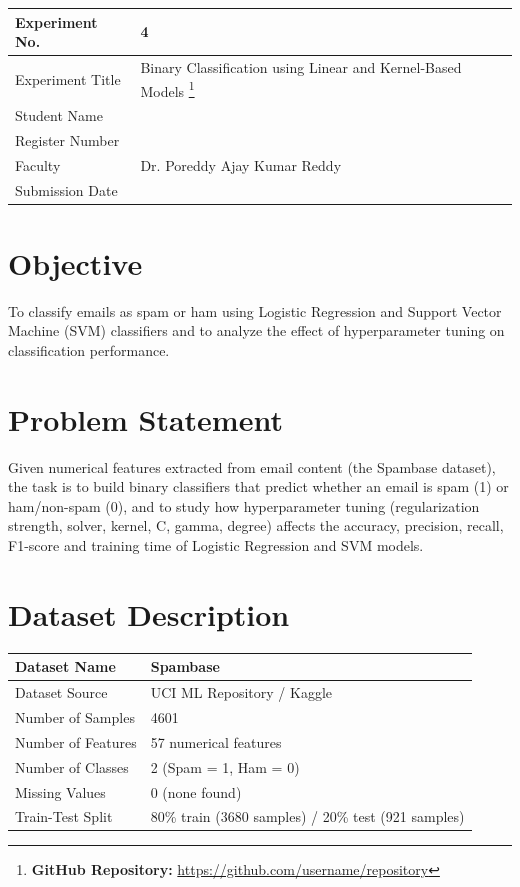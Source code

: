 \documentclass[12pt,a4paper]{article}
\begin{document}
\begin{tabular}{|p{4cm}|p{11cm}|}
\hline
Experiment No. & 4 \\ \hline
Experiment Title & Binary Classification using Linear and Kernel-Based Models
\footnote{\textbf{GitHub Repository: }\url{https://github.com/username/repository}}\\ \hline
Student Name & \\ \hline
Register Number & \\ \hline
Faculty & Dr. Poreddy Ajay Kumar Reddy \\ \hline
Submission Date & \\ \hline
\end{tabular}

\section{Objective}
To classify emails as spam or ham using Logistic Regression and Support Vector Machine (SVM)
classifiers and to analyze the effect of hyperparameter tuning on classification performance.

\section{Problem Statement}
Given numerical features extracted from email content (the Spambase dataset), the task is to
build binary classifiers that predict whether an email is spam (1) or ham/non-spam (0), and to
study how hyperparameter tuning (regularization strength, solver, kernel, C, gamma, degree)
affects the accuracy, precision, recall, F1-score and training time of Logistic Regression and
SVM models.

\section{Dataset Description}
\begin{longtable}{|p{6cm}|p{8cm}|}
\hline
Dataset Name & Spambase \\ \hline
Dataset Source & UCI ML Repository / Kaggle \\ \hline
Number of Samples & 4601 \\ \hline
Number of Features & 57 numerical features \\ \hline
Number of Classes & 2 (Spam = 1, Ham = 0) \\ \hline
Missing Values & 0 (none found) \\ \hline
Train-Test Split & 80\% train (3680 samples) / 20\% test (921 samples) \\ \hline
\end{longtable}
\end{document}
